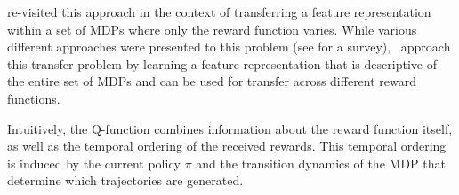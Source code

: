 \documentclass{article}
\begin{document}
\citet{barreto2016successor} re-visited this approach in the context of transferring a feature representation within a set of MDPs where only the reward function varies.
While various different approaches were presented to this problem (see \citet{stone2009transfersurvey} for a survey),~\citeauthor{barreto2016successor} approach this transfer problem by learning a feature representation that is descriptive of the entire set of MDPs and can be used for transfer across different reward functions.

Intuitively, the Q-function combines information about the reward function itself, as well as the temporal ordering of the received rewards.
This temporal ordering is induced by the current policy $\pi$ and the transition dynamics of the MDP that determine which trajectories are generated.
\end{document}
